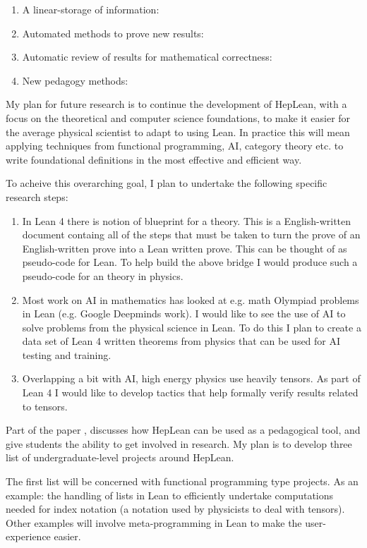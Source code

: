 \documentclass[12pt,letter]{article}
\newcounter{customtitle}
\begin{document}
\begin{enumerate}
\item A linear-storage of information:
\item Automated methods to prove new results:
\item Automatic review of results for mathematical correctness: 
\item New pedagogy methods:	
\end{enumerate}

My plan for future research is to continue the development of HepLean, with a focus on the theoretical and computer science foundations, to make it easier for the average physical scientist to adapt to using Lean. In practice this will mean applying techniques from functional programming, AI, category theory etc. to write foundational definitions in the most effective and efficient way. 

To acheive this overarching goal, I plan to undertake the following specific research steps:  
\begin{enumerate}
\item In Lean 4 there is notion of blueprint for a theory. This is 
a English-written document containg all of the steps that must be taken
to turn the prove of an English-written prove into a Lean written prove. 
This can be thought of as pseudo-code for Lean. To help build the above 
bridge I would produce such a pseudo-code for an theory in physics.
\item Most work on AI in mathematics has looked at e.g. math Olympiad problems
in Lean (e.g. Google Deepminds work). I would like to see the use 
of AI to solve problems from the physical science in Lean. To do this 
I plan to create a data set of Lean 4 written theorems from physics 
that can be used for AI testing and training.
\item Overlapping a bit with AI, high energy physics use heavily tensors. 
As part of Lean 4 I would like to develop tactics that help formally verify 
results related to tensors.
\end{enumerate}



Part of the paper , discusses how HepLean can be used 
as a pedagogical tool, and give students the ability to get involved in research.  My plan is to develop three list of undergraduate-level projects around HepLean. 

The first list will be concerned with functional programming type projects. As an example: the handling of lists in Lean to efficiently undertake computations needed for index notation (a notation used by physicists to deal with tensors). Other examples will involve meta-programming in Lean to make the user-experience easier.
\end{document}

